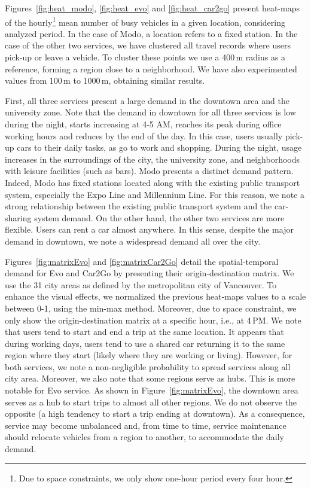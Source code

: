 Figures~\ref{fig:heat_modo}, \ref{fig:heat_evo} and \ref{fig:heat_car2go} present heat-maps of the hourly\footnote{Due to space constraints, we only show one-hour period every four hour.} mean number of busy vehicles in a given location, considering analyzed period. In the case of Modo, a location refers to a fixed station. In the case of the other two services, we have clustered all travel records where users pick-up or leave a vehicle. To cluster these points we use a 400\,m radius as a reference, forming a region close to a neighborhood. We have also experimented values from 100\,m to 1000\,m, obtaining similar results. 

First, all three services present a large demand in the downtown area and the university zone. Note that the demand in downtown for all three services is low during the night, starts increasing at 4-5 AM, reaches its peak during office working hours and reduces by the end of the day. In this case, users usually pick-up cars to their daily tasks, as go to work and shopping. During the night, usage increases in the surroundings of the city, the university zone, and neighborhoods with leisure facilities (such as bars). 
Modo presents a distinct demand pattern. Indeed, Modo has fixed stations located along with the existing public transport system, especially the Expo Line and Millennium Line. For this reason, we note a strong relationship between the existing public transport system and the car-sharing system demand. On the other hand, the other two services are more flexible. Users can rent a car almost anywhere. In this sense, despite the major demand in downtown, we note a widespread demand all over the city.

Figures~\ref{fig:matrixEvo} and \ref{fig:matrixCar2Go} detail the spatial-temporal demand for Evo and Car2Go by presenting their origin-destination matrix. We use the 31 city areas as defined by the metropolitan city of Vancouver. To enhance the visual effects, we normalized the previous heat-maps values to a scale between 0-1, using the min-max method. Moreover, due to space constraint, we only show the origin-destination matrix at a specific hour, i.e., at 4\,PM.
We note that users tend to start and end a trip at the same location. It appears that during working days, users tend to use a shared car  returning it to the same region where they start (likely where they are working or living). However, for both services, we note a non-negligible probability to spread services along all city area. 
Moreover, we also note that some regions serve as hubs. This is more notable for Evo service. As shown in Figure~\ref{fig:matrixEvo}, the downtown area serves as a hub to start trips to almost all other regions. We do not observe the opposite (a high tendency to start a trip ending at downtown). As a consequence, service may become unbalanced and, from time to time, service maintenance should relocate vehicles from a region to another, to accommodate the daily demand.

